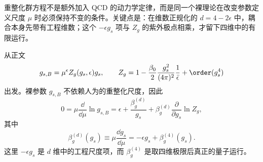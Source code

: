 \begin{derivation}[一圈强耦合演化与尺度参数]
重整化群方程不是额外加入 QCD 的动力学定律，而是同一个裸理论在改变参数定义尺度 \(\mu\) 时必须保持不变的条件。关键点是：在维数正规化的 \(d=4-2\epsilon\) 中，耦合本身先带有工程维数；这个 \(-\epsilon g_s\) 项与 \(Z_g\) 的紫外极点相乘，才留下四维中的有限运行。

从正文
\begin{equation*}
g_{s,B}=\mu^\epsilon Z_g(g_s,\epsilon)g_s,
\qquad
Z_g
=1-\frac{\beta_0}{2}
\frac{g_s^2}{(4\pi)^2}
\frac1{\bar\epsilon}
+\order(g_s^4)
\end{equation*}
出发。裸参数 \(g_{s,B}\) 不依赖人为的重整化尺度，因此
\begin{equation*}
0=\mu\frac{\dd}{\dd\mu}\ln g_{s,B}
=\epsilon
+\frac{\beta_g^{(d)}}{g_s}
+\beta_g^{(d)}\frac{\partial}{\partial g_s}\ln Z_g,
\end{equation*}
其中
\begin{equation*}
\beta_g^{(d)}(g_s)
\equiv\mu\frac{\dd g_s}{\dd\mu}
=-\epsilon g_s+\beta_g^{(4)}(g_s).
\end{equation*}
这里 \(-\epsilon g_s\) 是 \(d\) 维中的工程尺度项，而 \(\beta_g^{(4)}\) 是取四维极限后真正的量子运行。


\end{derivation}
